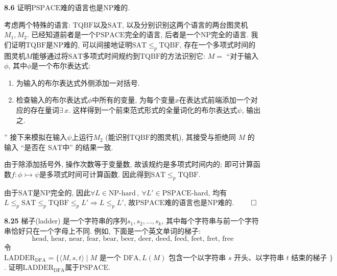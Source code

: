 \documentclass[UTF8]{report}
\newcommand{\problem}[1]{{\setlength{\parskip}{10pt}\noindent \bf{#1}}}
\renewenvironment{proof}{{\setlength{\parskip}{7pt}\noindent\hskip 2em \bf 证明 \quad}}{\hfill$\qed$\par}
\newcommand{\NP}{\mathrm{NP}}
\newcommand{\SAT}{\mathrm{SAT}}
\newcommand{\PSPACE}{\mathrm{PSPACE}}
\newcommand{\DFA}{\mathrm{DFA}}
\newcommand{\TQBF}{\mathrm{TQBF}}
\newcommand{\LADDER}{\mathrm{LADDER_{DFA}}}
\newcommand{\hd}{\mathrm{\text{-}hard}}
\begin{document}
\problem{8.6} 证明$\PSPACE$难的语言也是$\NP$难的. 

\begin{proof}
    考虑两个特殊的语言: $\TQBF$以及$\SAT$, 以及分别识别这两个语言的两台图灵机$M_1, M_2$. 已经知道前者是一个$\PSPACE$完全的语言, 后者是一个$\NP$完全的语言. 我们证明$\TQBF$是$\NP$难的, 可以间接地证明$\SAT \leq_p \TQBF$, 存在一个多项式时间的图灵机$M$能够通过将$\SAT$多项式时间规约到$\TQBF$的方法识别它: $M =$ ``对于输入$\phi$, 其中$\phi$是一个布尔表达式:
    \begin{enumerate}
        \item 为输入的布尔表达式外侧添加一对括号.
        \item 检查输入的布尔表达式$\phi$中所有的变量, 为每个变量$x$在表达式前端添加一个对应的存在量词$\exists\,x$. 这样得到一个前束范式形式的全量词化的布尔表达式$\psi$, 输出之.
    \end{enumerate}
    ''
    接下来模拟在输入$\psi$上运行$M_2$ (能识别$\TQBF$的图灵机), 其接受与拒绝同 $M$ 的输入 ``是否在 $\SAT$中'' 的结果一致.

    由于除添加括号外, 操作次数等于变量数, 故该规约是多项式时间内的; 即可计算函数$f: \phi \rightarrowtail \psi$是多项式时间可计算函数. 因此得到$\SAT \leq_p \TQBF$.
    
    由于$\SAT$是$\NP$完全的, 因此$\forall L \in \NP\hd\,,\ \forall L' \in \PSPACE\hd$, 均有$L \leq_p \SAT \leq_p \TQBF \leq_p L' \Longrightarrow L \leq_p L'$, 故$\PSPACE$难的语言也是$\NP$难的. 
\end{proof}

\problem{8.25} 梯子(ladder) 是一个字符串的序列$s_1, s_2, \dots, s_k$, 其中每个字符串与前一个字符串恰好只在一个字母上不同. 例如, 下面是一个英文单词的梯子: 
\[
    \text{head, hear, near, fear, bear, beer, deer, deed, feed, feet, fret, free}
\]
令$\LADDER = \{ \langle M,s,t \rangle \mid M\text{ 是一个 } \DFA, L(M)\text{ 包含一个以字符串 }s\text{ 开头、以字符串 }t\text{ 结束的梯子 } \}$. 证明$\LADDER$属于$\PSPACE$. 
\end{document}
